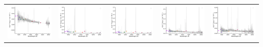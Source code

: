 \begin{center}
\begin{longtable}{l l l l l }
    \includegraphics[width=0.19\linewidth, clip]{Figs/Figs-sdss/spec-1085-52531-0175-STRIPE82-0017-027488.pdf} & \includegraphics[width=0.19\linewidth, clip]{Figs/Figs-sdss/spec-1089-52913-0196-STRIPE82-0007-024265.pdf} & \includegraphics[width=0.19\linewidth, clip]{Figs/Figs-sdss/spec-1089-52913-0199-STRIPE82-0007-023673.pdf} & \includegraphics[width=0.19\linewidth, clip]{Figs/Figs-sdss/spec-1089-52913-0386-STRIPE82-0006-034786.pdf} & \includegraphics[width=0.19\linewidth, clip]{Figs/Figs-sdss/spec-1090-52903-0539-STRIPE82-0006-015081.pdf} \\

\end{longtable}
\end{center}
